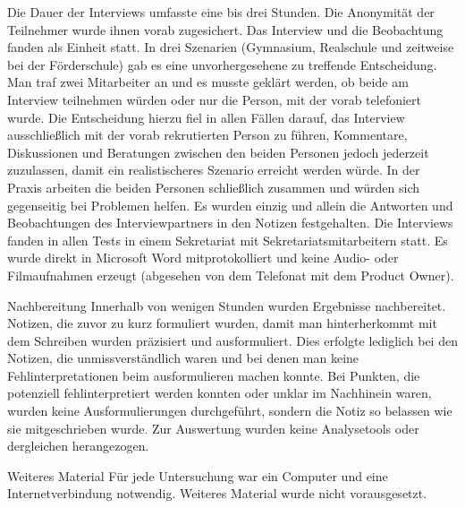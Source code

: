 Die Dauer der Interviews umfasste eine bis drei Stunden. 
Die Anonymität der Teilnehmer wurde ihnen vorab zugesichert.
Das Interview und die Beobachtung fanden als Einheit statt.
In drei Szenarien (Gymnasium, Realschule und zeitweise bei der Förderschule) gab es eine unvorhergesehene zu treffende Entscheidung. Man traf zwei Mitarbeiter an und es musste geklärt werden, ob beide am Interview teilnehmen würden oder nur die Person, mit der vorab telefoniert wurde. Die Entscheidung hierzu fiel in allen Fällen darauf, das Interview ausschließlich mit der vorab rekrutierten Person zu führen, Kommentare, Diskussionen und Beratungen zwischen den beiden Personen jedoch jederzeit zuzulassen, damit ein realistischeres Szenario erreicht werden würde. In der Praxis arbeiten die beiden Personen schließlich zusammen und würden sich gegenseitig bei Problemen helfen.
Es wurden einzig und allein die Antworten und Beobachtungen des Interviewpartners in den Notizen festgehalten.
Die Interviews fanden in allen Tests in einem Sekretariat mit Sekretariatsmitarbeitern statt. Es wurde direkt in Microsoft Word mitprotokolliert und keine Audio- oder Filmaufnahmen erzeugt (abgesehen von dem Telefonat mit dem Product Owner).

Nachbereitung
Innerhalb von wenigen Stunden wurden Ergebnisse nachbereitet. Notizen, die zuvor zu kurz formuliert wurden, damit man hinterherkommt mit dem Schreiben wurden präzisiert und ausformuliert. Dies erfolgte lediglich bei den Notizen, die unmissverständlich waren und bei denen man keine Fehlinterpretationen beim ausformulieren machen konnte. Bei Punkten, die potenziell fehlinterpretiert werden konnten oder unklar im Nachhinein waren, wurden keine Ausformulierungen durchgeführt, sondern die Notiz so belassen wie sie mitgeschrieben wurde. 
Zur Auswertung wurden keine Analysetools oder dergleichen herangezogen. 

Weiteres Material
Für jede Untersuchung war ein Computer und eine Internetverbindung notwendig. Weiteres Material wurde nicht vorausgesetzt.

